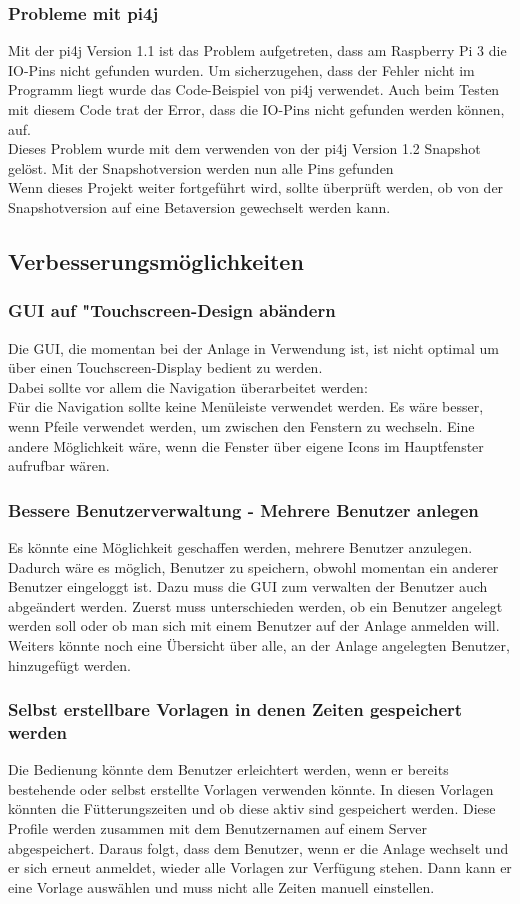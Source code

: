\subsubsection{Probleme mit pi4j}
Mit der pi4j Version 1.1 ist das Problem aufgetreten, dass am Raspberry Pi 3 die IO-Pins nicht gefunden wurden. Um sicherzugehen, dass der Fehler nicht im Programm liegt wurde das Code-Beispiel von pi4j verwendet. Auch beim Testen mit diesem Code trat der Error, dass die IO-Pins nicht gefunden werden können, auf.
\\ Dieses Problem wurde mit dem verwenden von der pi4j Version 1.2 Snapshot gelöst. Mit der Snapshotversion werden nun alle Pins gefunden
\\ Wenn dieses Projekt weiter fortgeführt wird, sollte überprüft werden, ob von der Snapshotversion auf eine Betaversion gewechselt werden kann.

\subsection{Verbesserungsmöglichkeiten}
\subsubsection{GUI auf "Touchscreen-Design\grqq{} abändern}
Die GUI, die momentan bei der Anlage in Verwendung ist, ist nicht optimal um über einen Touchscreen-Display bedient zu werden.
\\ Dabei sollte vor allem die Navigation überarbeitet werden: 
\\Für die Navigation sollte keine Menüleiste verwendet werden. Es wäre besser, wenn Pfeile verwendet werden, um zwischen den Fenstern zu wechseln. Eine andere Möglichkeit wäre, wenn die Fenster über eigene Icons im Hauptfenster aufrufbar wären.
\subsubsection{Bessere Benutzerverwaltung - Mehrere Benutzer anlegen}
Es könnte eine Möglichkeit geschaffen werden, mehrere Benutzer anzulegen. Dadurch wäre es möglich, Benutzer zu speichern, obwohl momentan ein anderer Benutzer eingeloggt ist. Dazu muss die GUI zum verwalten der Benutzer auch abgeändert werden. Zuerst muss unterschieden werden, ob ein Benutzer angelegt werden soll oder ob man sich mit einem Benutzer auf der Anlage anmelden will. Weiters könnte noch eine Übersicht über alle, an der Anlage angelegten Benutzer, hinzugefügt werden.
\subsubsection{Selbst erstellbare Vorlagen in denen Zeiten gespeichert werden}
Die Bedienung könnte dem Benutzer erleichtert werden, wenn er bereits bestehende oder selbst erstellte Vorlagen verwenden könnte. In diesen Vorlagen könnten die Fütterungszeiten und ob diese aktiv sind gespeichert werden. Diese Profile werden zusammen mit dem Benutzernamen auf einem Server abgespeichert. Daraus folgt, dass dem Benutzer, wenn er die Anlage wechselt und er sich erneut anmeldet, wieder alle Vorlagen zur Verfügung stehen. Dann kann er eine Vorlage auswählen und muss nicht alle Zeiten manuell einstellen.

